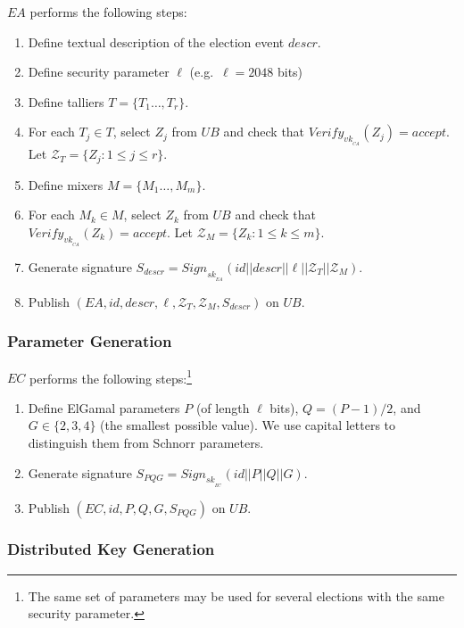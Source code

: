 \documentclass[bibtotoc,halfparskip,oneside]{scrreprt}
\newcommand{\eid}{\mathit{id}\xspace}
\newcommand{\descr}{\mathit{descr}\xspace}
\newcommand{\sk}[1]{\mathit{sk}_{#1}\xspace}
\newcommand{\vk}[1]{\mathit{vk}_{#1}\xspace}
\newcommand{\SK}[1]{\sk{_#1}\xspace}
\newcommand{\VK}[1]{\vk{_#1}\xspace}
\newcommand{\CA}{\ensuremath{\mathit{CA}}\xspace}
\newcommand{\EA}{\ensuremath{\mathit{EA}}\xspace}
\newcommand{\EC}{\ensuremath{\mathit{EC}}\xspace}
\newcommand{\UB}{\ensuremath{\mathit{UB}}\xspace}
\newcommand{\Tallier}[1]{\ensuremath{\mathit{T}_{#1}}\xspace}
\newcommand{\Mixer}[1]{\ensuremath{\mathit{M}_{#1}}\xspace}
\begin{document}
\EA performs the following steps: 
\begin{enumerate}
	\item Define textual description of the election event $\descr$.
	\item Define security parameter $\ell$ (e.g.\ $\ell=2048$ bits)
	\item Define talliers $T=\{\Tallier{1}\ldots,\Tallier{r}\}$.
	\item For each $\Tallier{j}\in T$, select $Z_{j}$ from \UB and check that $\mathit{Verify}_{\VK{\CA}}(Z_{j})=\mathit{accept}$. Let $\mathcal{Z}_{T}=\{Z_j:1\leq j\leq r\}$.
	\item Define mixers $M=\{\Mixer{1}\ldots,\Mixer{m}\}$.
	\item For each $\Mixer{k}\in M$, select $Z_{k}$ from \UB and check that $\mathit{Verify}_{\VK{\CA}}(Z_{k})=\mathit{accept}$. Let $\mathcal{Z}_{M}=\{Z_k:1\leq k\leq m\}$.
	\item Generate signature $S_{\descr}=\mathit{Sign}_{\SK{\EA}}(\eid||\descr||\ell||\mathcal{Z}_{T}||\mathcal{Z}_{M})$.
	\item Publish $(\EA,\eid,\descr,\ell,\mathcal{Z}_{T},\mathcal{Z}_{M},S_{\descr})$ on \UB.
\end{enumerate}

\subsubsection{Parameter Generation}

\EC performs the following steps:\footnote{The same set of parameters may be used for several elections with the same security parameter.}
\begin{enumerate}
	\item Define ElGamal parameters $P$ (of length $\ell$ bits), $Q = (P-1)/2$, and $G \in\{2,3,4\}$ (the smallest possible value). We use capital letters to distinguish them from Schnorr parameters.
	\item Generate signature $S_{\mathit{PQG}}=\mathit{Sign}_{\SK{\EC}}(\eid||P||Q||G)$.
	\item Publish $(\EC,\eid,P,Q,G,S_{\mathit{PQG}})$ on \UB.
\end{enumerate}

\subsubsection{Distributed Key Generation}
\end{document}
